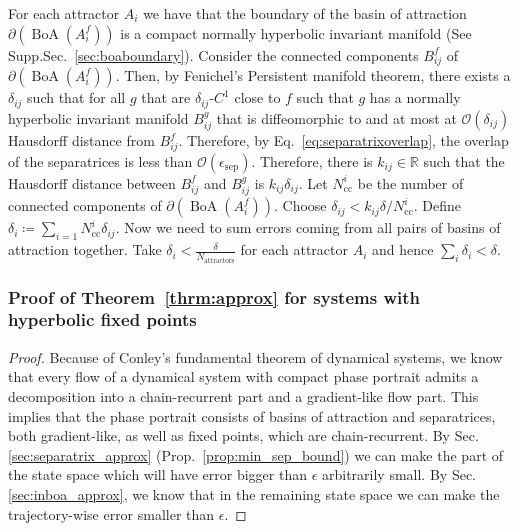 \documentclass{article}
\theoremstyle{definition} \newtheorem{definition}{Definition}
\theoremstyle{remark} \newtheorem{remark}{Remark}
\newcommand{\reals}{\mathbb{R}}
\newcommand{\boa}{\operatorname{BoA}}
\newcounter{ct}
\begin{document}
For each attractor $A_i$ we have that the boundary of the basin of attraction $\partial(\boa(A_i^f))$ is a compact normally hyperbolic invariant manifold (See Supp.Sec.~\ref{sec:boaboundary}).
Consider the connected components $B^f_{ij}$ of $\partial(\boa(A_i^f))$. %
Then, by Fenichel's Persistent manifold theorem, there exists a $\delta_{ij}$ such that for all $g$ that are $\delta_{ij}$-$C^1$ close to $f$ such that $g$ has a normally hyperbolic invariant manifold  $B^g_{ij}$ that is diffeomorphic to and at most at $\mathcal{O}(\delta_{ij})$ Hausdorff distance from $B^f_{ij}$.
Therefore, by Eq.~\ref{eq:separatrixoverlap}, the overlap of the separatrices is less than $\mathcal{O}(\epsilon_{\operatorname{sep}})$. %
Therefore, there is $k_{ij}\in\reals$ such that the Hausdorff distance between $B^f_{ij}$ and $B^g_{ij}$ is $k_{ij}\delta_{ij}$.
Let  $N_{\operatorname{cc}}^i$ be the number of connected components of $\partial(\boa(A_i^f))$.
Choose $\delta_{ij}<k_{ij}\delta/N_{\operatorname{cc}}^i$. 
Define $\delta_i\coloneqq\sum_{i=1}{N_{\operatorname{cc}}^i}\delta_{ij}$.
Now we need to sum errors coming from all pairs of basins of attraction together.
Take $\delta_i< \frac{\delta}{N_{\operatorname{attractors}}}$ for each attractor $A_i$ and hence $\sum_i\delta_i<\delta$.





\subsubsection{Proof of Theorem~\ref{thrm:approx} for systems with hyperbolic fixed points}\label{sec:proof_fp_approx}
\begin{proof}%
Because of Conley's fundamental theorem of dynamical systems\citep{conley1978morse}, we know that every flow of a dynamical system with compact phase portrait admits a decomposition into a chain-recurrent part and a gradient-like flow part.
This implies that the phase portrait consists of basins of attraction and separatrices, both gradient-like, as well as fixed points, which are chain-recurrent.
%
By Sec.\ref{sec:separatrix_approx} (Prop.~\ref{prop:min_sep_bound}) we can make the part of the state space which will have error bigger than $\epsilon$ arbitrarily small. %
By Sec.\ref{sec:inboa_approx}, we know that in the remaining state space we can make the trajectory-wise error smaller than $\epsilon$.
\end{proof}
\end{document}
